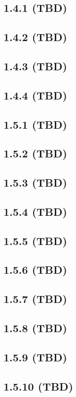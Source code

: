 \documentclass[11pt]{article}
\begin{document}
\subsection*{1.4.1 (TBD)}

\subsection*{1.4.2 (TBD)}

\subsection*{1.4.3 (TBD)}

\subsection*{1.4.4 (TBD)}

\subsection*{1.5.1 (TBD)}
\subsection*{1.5.2 (TBD)}
\subsection*{1.5.3 (TBD)}
\subsection*{1.5.4 (TBD)}
\subsection*{1.5.5 (TBD)}
\subsection*{1.5.6 (TBD)}
\subsection*{1.5.7 (TBD)}
\subsection*{1.5.8 (TBD)}
\subsection*{1.5.9 (TBD)}
\subsection*{1.5.10 (TBD)}
\end{document}

